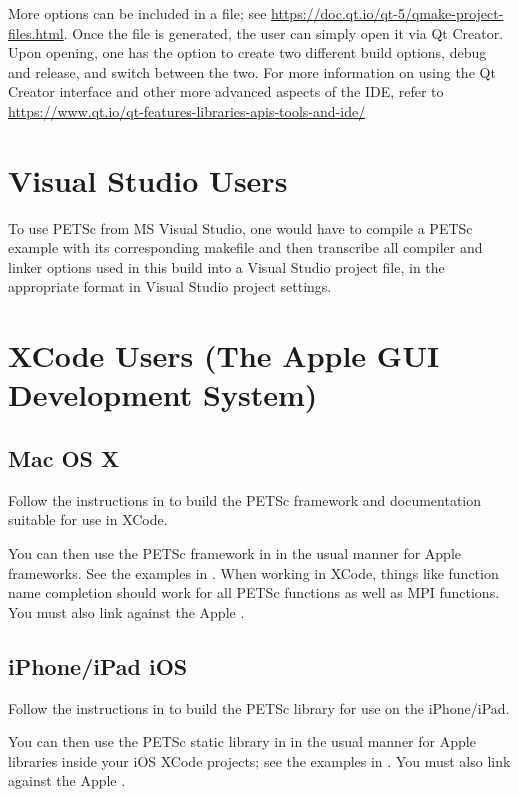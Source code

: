 {{{More options can be included in a  file; see \url{https://doc.qt.io/qt-5/qmake-project-files.html}.
Once the  file is generated, the user can simply open it via Qt Creator.
Upon opening, one has the option to create two different build options, debug and release, and switch between the two.
For more information on using the Qt Creator interface and other more advanced aspects of the IDE, refer to \url{https://www.qt.io/qt-features-libraries-apis-tools-and-ide/}

\section{Visual Studio Users} 

To use PETSc from MS Visual Studio, one would have to compile a PETSc example with its corresponding makefile and then transcribe all compiler and linker options used in this build into a Visual Studio project file, in the appropriate format in Visual Studio project settings.

\section{XCode Users (The Apple GUI Development System)} 
\subsection{Mac OS X}

Follow the instructions in  to build the PETSc framework and documentation suitable for use in XCode.

You can then use the PETSc framework in  in the usual manner for Apple frameworks.
See the examples in .  When working in XCode, things like function name completion should work for all PETSc functions as well as MPI functions. You must also link against the Apple .

\subsection{iPhone/iPad iOS}

Follow the instructions in  to build the PETSc library for use on the iPhone/iPad.

You can then use the PETSc static library in  in the usual manner for Apple libraries inside your iOS XCode projects; see the examples in .  You must also link against the Apple .

}}}

